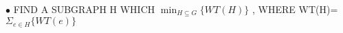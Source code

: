 \documentclass[preview]{standalone}
\begin{document}
\begin{center}
$\bullet$ FIND   A   SUBGRAPH   H  WHICH \color{red}{HAS} $\min_{\scriptscriptstyle H \subseteq G} \{ WT(H) \}$ ,  WHERE   WT(H)= $\Sigma_{e \in H} \{ WT(e) \}$
\end{center}
\end{document}
